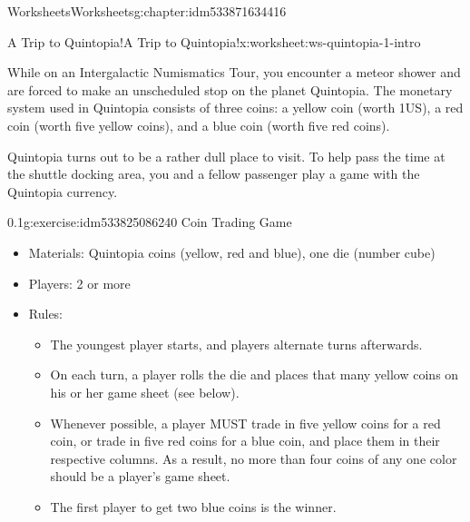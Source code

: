 \documentclass[twoside,11pt,]{book}
\begin{document}
\begin{chapterptx}{Worksheets}{}{Worksheets}{}{}{g:chapter:idm533871634416}
%
%
\typeout{************************************************}
\typeout{************************************************}
%
\begin{worksheet-section-numberless}{A Trip to Quintopia!}{}{A Trip to Quintopia!}{}{}{x:worksheet:ws-quintopia-1-intro}
\begin{introduction}{}%
While on an Intergalactic Numismatics Tour, you encounter a meteor shower and are forced to make an unscheduled stop on the planet Quintopia.  The monetary system used in Quintopia consists of three coins:  a yellow coin (worth \textdollar{}1US), a red coin (worth five yellow coins), and a blue coin (worth five red coins).%
\par
Quintopia turns out to be a rather dull place to visit.  To help pass the time at the shuttle docking area, you and a fellow passenger play a game with the Quintopia currency.%
\end{introduction}%
\begin{divisionexercise}{1}{}{0.1}{g:exercise:idm533825086240}%
Coin Trading Game%
%
\begin{itemize}[label=\textbullet]
\item{}Materials:  Quintopia coins (yellow, red and blue), one die (number cube)%
\item{}Players:  2 or more%
\item{}Rules:%
\begin{itemize}[label=$\circ$]
\item{}The youngest player starts, and players alternate turns afterwards.%
\item{}On each turn, a player rolls the die and places that many yellow coins on his or her game sheet (see below).%
\item{}Whenever possible, a player MUST trade in five yellow coins for a red coin, or trade in five red coins for a blue coin, and place them in their respective columns.  As a result, no more than four coins of any one color should be a player’s game sheet.%
\item{}The first player to get two blue coins is the winner.%
\end{itemize}
%
\end{itemize}
\begin{sidebyside}{1}{0}{0}{0}%
\begin{sbspanel}{1}%

\end{sbspanel}
\end{sidebyside}
\end{divisionexercise}
\end{worksheet-section-numberless}
\end{chapterptx}
\end{document}
